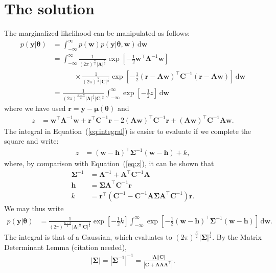 \documentclass[modern]{rnaastex}
\renewcommand{\eqref}[1]{\ref{eq:#1}}
\newcommand{\Eq}[1]{Equation~(\eqref{#1})}
\newcommand{\eq}[1]{\Eq{#1}}
\newcommand{\eqlabel}[1]{\label{eq:#1}}
\newcommand{\citeme}{{\color{red}(citation needed)}}
\newcommand{\dd}{\ensuremath{\,\mathrm{d}}}
\newcommand{\bvec}[1]{{\ensuremath{\boldsymbol{#1}}}}
\newcommand{\Gaussian}[3]{\ensuremath{\frac{1}{(2\pi)^\frac{#3}{2}|#2|^\frac{1}{2}}
            \exp\left[ -\frac{1}{2}#1^\top #2^{-1} #1 \right]}}
\newcommand{\mA}{\ensuremath{\bvec{A}}}
\newcommand{\mC}{\ensuremath{\bvec{C}}}
\newcommand{\mS}{\ensuremath{\bvec{\Sigma}}}
\newcommand{\mL}{\ensuremath{\bvec{\Lambda}}}
\newcommand{\vw}{\ensuremath{\bvec{w}}}
\newcommand{\vy}{\ensuremath{\bvec{y}}}
\newcommand{\vt}{\ensuremath{\bvec{\theta}}}
\newcommand{\vm}{\ensuremath{\bvec{\mu}(\bvec{\theta})}}
\newcommand{\vre}{\ensuremath{\bvec{r}}}
\newcommand{\vh}{\ensuremath{\bvec{h}}}
\begin{document}
\section{The solution}

The marginalized likelihood can be manipulated as follows:
\begin{align}
\eqlabel{integral}
p(\vy | \vt) &= \int_{-\infty}^{\infty} p(\vw) p(\vy | \vt, \vw) \dd\vw \nonumber \\
%
             &= \int_{-\infty}^{\infty} \Gaussian{\vw}{\mL}{K} \nonumber\\
             & \quad\quad\quad \times \Gaussian{(\vre - \mA \vw)}{\mC}{N}
               \dd\vw \nonumber \\
%
             &= \frac{1}{(2 \pi)^\frac{K + N}{2} |\mL|^\frac{1}{2} |\mC|^\frac{1}{2}}
                \int_{-\infty}^{\infty} \exp \left[ -\frac{1}{2} z \right] \dd\vw
\end{align}
%
where we have used $\vre = \vy - \vm$ and
%
\begin{align}
\eqlabel{z}
z &= \vw^\top \mL^{-1} \vw + \vre^\top \mC^{-1} \vre -
     2(\mA \vw)^\top \mC^{-1} \vre + (\mA \vw)^\top \mC^{-1} \mA \vw.
\end{align}
%
The integral in \eq{integral} is easier to evaluate if we
complete the square and write:
%
\begin{align}
\eqlabel{z_square}
z &= (\vw - \vh)^\top \mS^{-1} (\vw - \vh) + k,
\end{align}
%
where, by comparison with \eq{z}, it can be shown that
%
\begin{align}
\mS^{-1} &= \mL^{-1} + \mA^\top \mC^{-1} \mA \\
%
\vh &= \bvec{\Sigma}\mA^\top \mC^{-1} \vre \\
%
k &= \vre^\top \left( \mC^{-1} - \mC^{-1} \mA \mS \mA^\top \mC^{-1} \right) \vre.
\end{align}
%
We may thus write
%
\begin{align}
\eqlabel{p(y|t)ugly}
p(\vy | \vt) &= \frac{1}{(2 \pi)^\frac{K + N}{2}
                |\mL|^\frac{1}{2}
                |\mC|^\frac{1}{2}}
                \exp \left[ -\frac{1}{2}k \right]
                \int_{-\infty}^{\infty} \exp
                \left[-\frac{1}{2}(\vw - \vh)^\top \mS^{-1} (\vw - \vh)
                \right] \dd\vw.
\end{align}
%
The integral is that of a Gaussian, which evaluates to
$(2\pi)^\frac{K}{2}|\bvec{\Sigma}|^\frac{1}{2}$.
By the Matrix Determinant Lemma \citeme,
%
\begin{align}
|\mS| = {|\mS^{-1}|}^{-1} = \frac{|\mL| |\mC|}{|\mC + \mA \mL \mA^\top|}.
\end{align}
\end{document}
